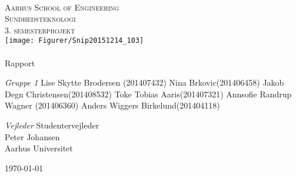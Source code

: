 \begin{titlingpage}
\begin{center}

~ \\[2cm]

\textsc{\LARGE Aarhus School of Engineering}\\[1cm]

\textsc{\Large Sundhedsteknologi}\\
\textsc{\Large 3. semesterprojekt}\\[1cm]

\texttt{[image: Figurer/Snip20151214\_103]}\\[1cm]

\noindent\makebox[\linewidth]{\rule{\textwidth}{0.4pt}}\\
[0.5cm]{\Huge Rapport}
\noindent\makebox[\linewidth]{\rule{\textwidth}{0.4pt}}

\end{center}

\textit{Gruppe 1} \newline
Lise Skytte Brodersen (201407432) \newline
Nina Brkovic(201406458) \newline
Jakob Degn Christensen(201408532) \newline
Toke Tobias Aaris(201407321) \newline		 
Annsofie Randrup Wagner (201406360) \newline 
Anders Wiggers Birkelund(201404118) \newline


\textit{Vejleder} \newline
Studentervejleder\\
Peter Johansen\\
Aarhus Universitet


\vfill

\begin{center}
{\large \today}
\end{center}


\end{titlingpage}